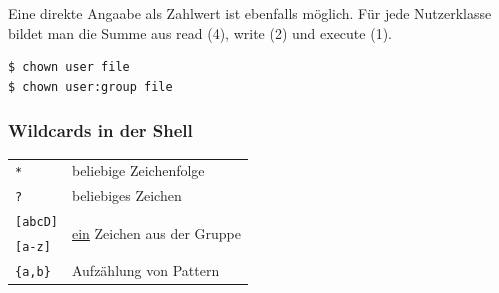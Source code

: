 	Eine direkte Angaabe als Zahlwert ist ebenfalls möglich. Für jede Nutzerklasse bildet man die Summe
	aus read (4), write (2) und execute (1).

	\begin{lstlisting}
$ chown user file
$ chown user:group file
	\end{lstlisting}


	\subsubsection*{Wildcards in der Shell} %
	\label{ssub:wildcards_in_der_shell}

	\begin{tabular}{ll}
		\texttt{*} 	& beliebige Zeichenfolge\\
		\texttt{?} 	& beliebiges Zeichen\\
		\texttt{[abcD]} 	& \multirow{2}{*}{\underline{ein} Zeichen aus der Gruppe}\\
		\texttt{[a-z]} 	&\\
		\texttt{\{a,b\}} 	& Aufzählung von Pattern\\
	\end{tabular}


